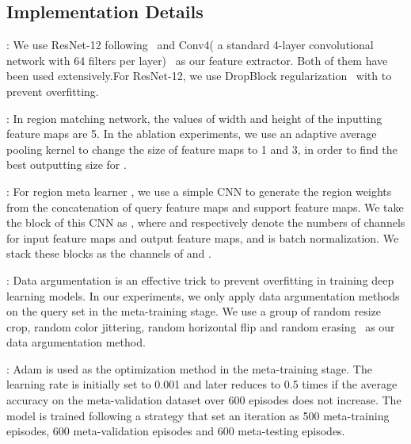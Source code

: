 \documentclass[letterpaper]{article}
\begin{document}
\subsection{Implementation Details}
:
We use ResNet-12 following~\cite{lee2019meta,mishra2017simple} and Conv4( a standard 4-layer convolutional network with 64 filters per layer)~\cite{sung2018learning,li2019revisiting,VinyalsMatching} as our feature extractor. Both of them have been used extensively.For ResNet-12, we use DropBlock regularization~\cite{ghiasi2018dropblock} with  to prevent overfitting. 


:
In region matching network, the values of width and height of the inputting feature maps  are 5. In the ablation experiments, we use an adaptive average pooling kernel to change the size of feature maps to 1 and 3, in order to find the best outputting size for . 

:
For region meta learner , we use a simple CNN to generate the region weights from the concatenation of query feature maps and support feature maps. We take the block of this CNN as , where  and  respectively denote the numbers of channels for input feature maps and output feature maps, and  is batch normalization. We stack these blocks as the channels of  and . 

:
Data argumentation is an effective trick to prevent overfitting in training deep learning models. In our experiments, we only apply data argumentation methods on the query set in the meta-training stage. We use a group of random resize crop, random color jittering, random horizontal flip and random erasing~\cite{zhong2020RandomE} as our data argumentation method.

: 
Adam is used as the optimization method in the meta-training stage. The learning rate is initially set to 0.001 and later reduces to 0.5 times if the average accuracy on the meta-validation dataset over 600 episodes does not increase. The model is trained following a strategy that set an iteration as 500 meta-training episodes, 600 meta-validation episodes and 600 meta-testing episodes. 
\end{document}
